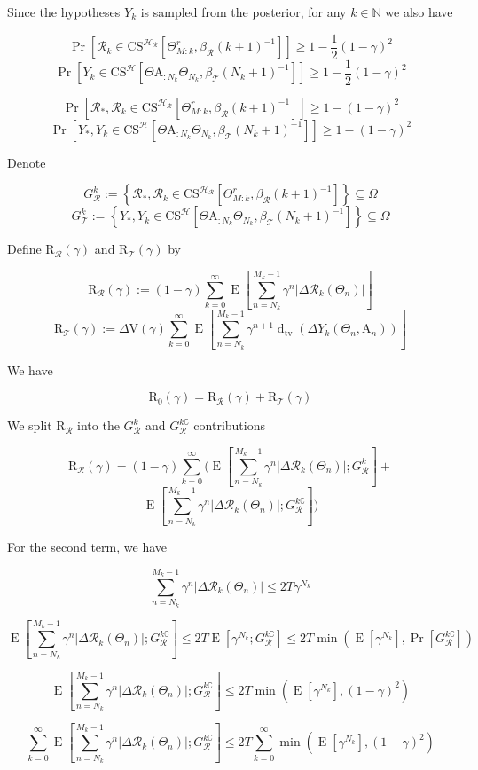 \documentclass[a4paper]{article}
\newcommand{\AP}[1]{\left(#1\right)}
\newcommand{\AB}[1]{\left[#1\right]}
\newcommand{\AC}[1]{\left\{#1\right\}}
\newcommand{\Abs}[1]{\left\vert #1 \right\vert}
\newcommand{\Pb}[1]{\operatorname{Pr}\AB{#1}}
\newcommand{\E}[1]{\operatorname{E}\AB{#1}}
\newcommand{\Dtva}[1]{\operatorname{d}_{\text{tv}}\AP{#1}}
\newcommand{\Nats}{\mathbb{N}}
\newcommand{\R}{\mathcal{R}}
\newcommand{\T}{\mathcal{T}}
\newcommand{\Hy}{\mathcal{H}}
\newcommand{\V}{\mathrm{V}}
\newcommand{\Reg}{\mathrm{R}}
\newcommand{\THy}{Y_*}
\newcommand{\SHy}{Y}
\newcommand{\AT}{\mathrm{A}}
\newcommand{\ET}{N}
\newcommand{\IT}{M}
\newcommand{\CSE}{G}
\newcommand{\CS}{\mathrm{CS}}
\begin{document}
Since the hypotheses $\SHy_k$ is sampled from the posterior, for any $k\in\Nats$ we also have

$$\Pb{\R_k\in\CS^{\Hy_\R}\AB{\Theta_{M:k}^{r},\beta_\R(k+1)^{-1}}} \geq 1-\frac{1}{2}(1-\gamma)^2$$
$$\Pb{\SHy_{k}\in\CS^\Hy\AB{\Theta\AT_{:N_k}\Theta_{N_k},\beta_\T\AP{N_k+1}^{-1}}} \geq 1-\frac{1}{2}(1-\gamma)^2$$

$$\Pb{\R_*,\R_k\in\CS^{\Hy_\R}\AB{\Theta_{M:k}^{r},\beta_\R(k+1)^{-1}}} \geq 1-(1-\gamma)^2$$
$$\Pb{\THy,\SHy_{k}\in\CS^\Hy\AB{\Theta\AT_{:N_k}\Theta_{N_k},\beta_\T\AP{N_k+1}^{-1}}} \geq 1-(1-\gamma)^2$$

Denote

$$\CSE_\R^k:=\AC{\R_*,\R_k\in\CS^{\Hy_\R}\AB{\Theta_{M:k}^{r},\beta_\R(k+1)^{-1}}}\subseteq\Omega$$
$$\CSE_\T^k:=\AC{\THy,\SHy_{k}\in\CS^\Hy\AB{\Theta\AT_{:N_k}\Theta_{N_k},\beta_\T\AP{N_k+1}^{-1}}}\subseteq\Omega$$

Define $\Reg_{\R}(\gamma)$ and $\Reg_{\T}(\gamma)$ by

$$\Reg_{\R}(\gamma):=(1-\gamma)\sum_{k=0}^\infty\E{\sum_{n=\ET_k}^{\IT_k-1}\gamma^{n}\Abs{\Delta\R_k\AP{\Theta_n}}}$$
$$\Reg_{\T}(\gamma):=\Delta\V(\gamma)\sum_{k=0}^\infty\E{\sum_{n=\ET_k}^{\IT_k-1}\gamma^{n+1}\Dtva{\Delta\SHy_k\AP{\Theta_n,\AT_n}}}$$

We have

$$\Reg_0(\gamma)=\Reg_{\R}(\gamma)+\Reg_{\T}(\gamma)$$

We split $\Reg_{\R}$ into the $\CSE_\R^k$ and $\CSE_\R^{k\complement}$ contributions

$$\Reg_{\R}(\gamma)=(1-\gamma)\sum_{k=0}^\infty\Bigg(\E{\sum_{n=\ET_k}^{\IT_k-1}\gamma^{n}\Abs{\Delta\R_k\AP{\Theta_n}};\CSE_\R^k}+$$
$$\E{\sum_{n=\ET_k}^{\IT_k-1}\gamma^{n}\Abs{\Delta\R_k\AP{\Theta_n}};\CSE_\R^{k\complement}}\Bigg)$$

For the second term, we have

$$\sum_{n=\ET_k}^{\IT_k-1}\gamma^{n}\Abs{\Delta\R_k\AP{\Theta_n}}\leq2T\gamma^{N_k}$$

$$\E{\sum_{n=\ET_k}^{\IT_k-1}\gamma^{n}\Abs{\Delta\R_k\AP{\Theta_n}};\CSE_\R^{k\complement}}\leq2T\E{\gamma^{N_k};\CSE_\R^{k\complement}}\leq2T\min\AP{\E{\gamma^{N_k}},\Pb{\CSE_\R^{k\complement}}}$$

$$\E{\sum_{n=\ET_k}^{\IT_k-1}\gamma^{n}\Abs{\Delta\R_k\AP{\Theta_n}};\CSE_\R^{k\complement}}\leq2T\min\AP{\E{\gamma^{N_k}},(1-\gamma)^2}$$

$$\sum_{k=0}^\infty\E{\sum_{n=\ET_k}^{\IT_k-1}\gamma^{n}\Abs{\Delta\R_k\AP{\Theta_n}};\CSE_\R^{k\complement}}\leq 2T\sum_{k=0}^\infty\min\AP{\E{\gamma^{N_k}},(1-\gamma)^2}$$
\end{document}
